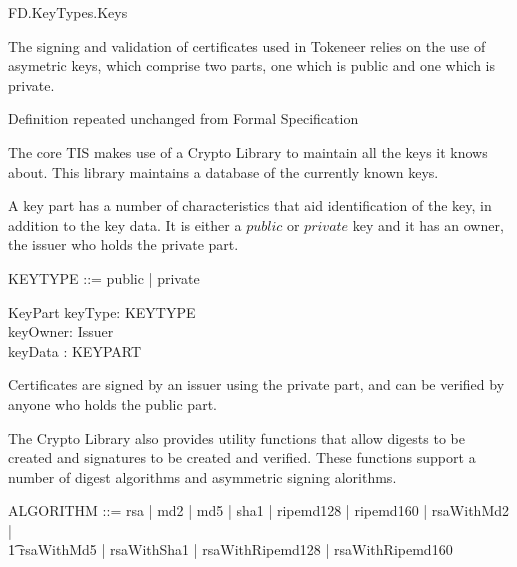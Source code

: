 \begin{traceunit}{FD.KeyTypes.Keys}
\end{traceunit}

The signing and validation of certificates used in Tokeneer relies on
the use of
asymetric keys, which comprise two parts, one which is public and
one which is private. 
\begin{zed}
        [ KEYPART ]
\end{zed}
\begin{Zcomment}
\item Definition repeated unchanged from Formal Specification \cite{FS}
\end{Zcomment}

The core TIS makes use of a Crypto Library to maintain all the keys it
knows about. This library maintains a database of the currently known
keys.

A key part has a number of characteristics that aid identification of the
key, in addition to the key data. It is either a $public$ or $private$
key and it has an owner, the issuer who holds the private part.

\begin{zed}
        KEYTYPE ::= public | private
\end{zed}

\begin{schema}{KeyPart}
        keyType: KEYTYPE
\\      keyOwner: Issuer
\\      keyData : KEYPART
\end{schema}      

Certificates are signed by an issuer using the private part, and can
be verified by anyone who holds the public part. 

The Crypto Library also provides utility functions that allow digests to be
created and signatures to be created and verified. These functions
support a number of digest algorithms and asymmetric signing alorithms.

\begin{zed}
        ALGORITHM ::= rsa | md2 | md5 | sha1 | ripemd128 | ripemd160 |
       rsaWithMd2 | 
\\ \t1 rsaWithMd5 | rsaWithSha1 | rsaWithRipemd128 | rsaWithRipemd160  
\end{zed}

\newcommand{\isVerifiedBy}{\mathrel{\sf isVerifiedBy}}

